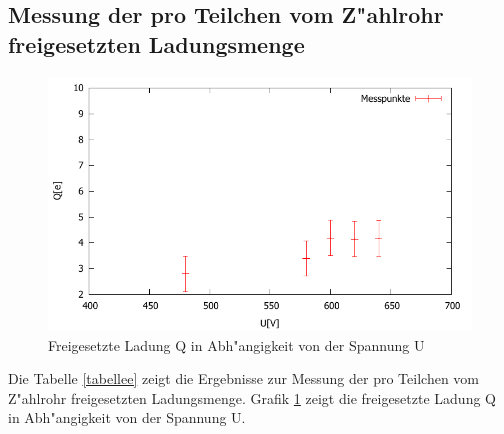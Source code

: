 	\subsection{Messung der pro Teilchen vom Z"ahlrohr freigesetzten Ladungsmenge} %
	\label{sub:messung_der_pro_teilchen_vom_z"ahlrohr_freigesetzten_ladungsmenge}
	
	

	\begin{figure}[!h]
		\centering
		\includegraphics[width = 16cm]{img/ladung.pdf}
		\caption{Freigesetzte Ladung Q in Abh"angigkeit von der Spannung U}
		\label{ladung}
	\end{figure}

	Die Tabelle \ref{tabellee} zeigt die Ergebnisse zur Messung der pro Teilchen vom Z"ahlrohr freigesetzten Ladungsmenge.
	Grafik \ref{ladung} zeigt die freigesetzte Ladung Q in Abh"angigkeit von der Spannung U.